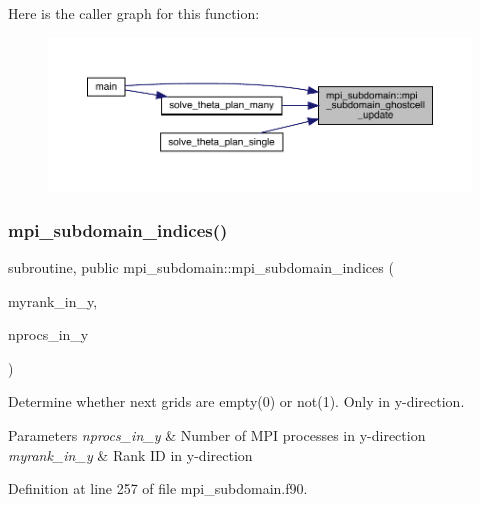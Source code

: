 Here is the caller graph for this function\+:
\nopagebreak
\begin{figure}[H]
\begin{center}
\leavevmode
\includegraphics[width=350pt]{namespacempi__subdomain_a2e34a77537009dd448375e8fdc8d5b62_icgraph}
\end{center}
\end{figure}
\mbox{\label{namespacempi__subdomain_afe948dc18da021f2448cf9a6265155fe}} 
\subsubsection{\texorpdfstring{mpi\_subdomain\_indices()}{mpi\_subdomain\_indices()}}
{\footnotesize\ttfamily subroutine, public mpi\+\_\+subdomain\+::mpi\+\_\+subdomain\+\_\+indices (\begin{DoxyParamCaption}\item[{integer, intent(in)}]{myrank\+\_\+in\+\_\+y,  }\item[{integer, intent(in)}]{nprocs\+\_\+in\+\_\+y }\end{DoxyParamCaption})}



Determine whether next grids are empty(0) or not(1). Only in y-\/direction. 


\begin{DoxyParams}{Parameters}
{\em nprocs\+\_\+in\+\_\+y} & Number of M\+PI processes in y-\/direction \\
\hline
{\em myrank\+\_\+in\+\_\+y} & Rank ID in y-\/direction \\
\hline
\end{DoxyParams}


Definition at line 257 of file mpi\+\_\+subdomain.\+f90.

